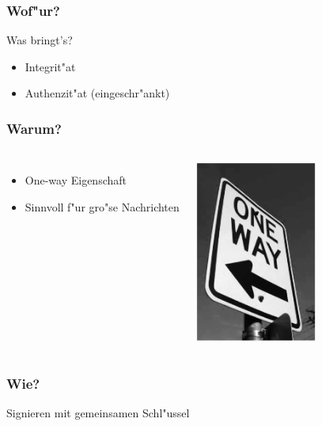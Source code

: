 \documentclass{beamer}
\begin{document}
\begin{frame}
	\frametitle{Wof"ur?}
	Was bringt's?
	\begin{itemize}
		\item Integrit"at
		\item Authenzit"at \small{(eingeschr"ankt)}
	\end{itemize}

\end{frame}

\begin{frame}
\frametitle{Warum?}
	\begin{columns}
	\column{6cm}
		\begin{itemize}
			\item One-way Eigenschaft
			\item Sinnvoll f"ur gro"se Nachrichten
		\end{itemize}
	\column{6cm}
		\begin{center}
			\includegraphics[width=4cm,height=6cm]{oneway.ps}
		\end{center}
	\end{columns}
\end{frame}

\begin{frame}
\frametitle{Wie?}
	Signieren mit gemeinsamen Schl"ussel
	\par
\end{frame}
\end{document}
